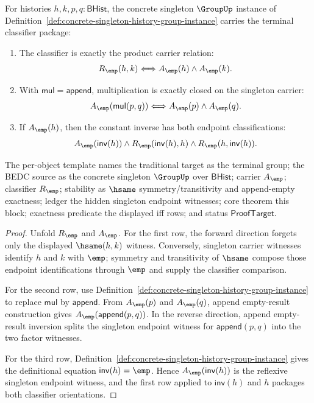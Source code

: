 \begin{theorem}
\label{thm:group-singleton-terminal-classifier-package}
For histories $h,k,p,q:\mathsf{BHist}$, the concrete singleton $\GroupUp$
instance of Definition~\ref{def:concrete-singleton-history-group-instance}
carries the terminal classifier package:
\begin{enumerate}
\item The classifier is exactly the product carrier relation:
$$
R_{\emp}(h,k)\Longleftrightarrow A_{\emp}(h)\land A_{\emp}(k).
$$

\item With $\mathsf{mul}=\mathsf{append}$, multiplication is exactly closed on
the singleton carrier:
$$
A_{\emp}(\mathsf{mul}(p,q))\Longleftrightarrow A_{\emp}(p)\land A_{\emp}(q).
$$

\item If $A_{\emp}(h)$, then the constant inverse has both endpoint
classifications:
$$
A_{\emp}(\mathsf{inv}(h))\land R_{\emp}(\mathsf{inv}(h),h)\land R_{\emp}(h,\mathsf{inv}(h)).
$$
\end{enumerate}
The per-object template names the traditional target as the terminal group; the
BEDC source as the concrete singleton $\GroupUp$ over $\mathsf{BHist}$; carrier
$A_{\emp}$; classifier $R_{\emp}$; stability as $\hsame$ symmetry/transitivity
and append-empty exactness; ledger the hidden singleton endpoint witnesses; core
theorem this block; exactness predicate the displayed iff rows; and status
$\mathsf{ProofTarget}$.
\end{theorem}
\begin{proof}
Unfold $R_{\emp}$ and $A_{\emp}$. For the first row, the forward direction
forgets only the displayed $\hsame(h,k)$ witness. Conversely, singleton carrier
witnesses identify $h$ and $k$ with $\emp$; symmetry and transitivity of
$\hsame$ compose those endpoint identifications through $\emp$ and supply the
classifier comparison.

For the second row, use Definition~\ref{def:concrete-singleton-history-group-instance}
to replace $\mathsf{mul}$ by $\mathsf{append}$. From $A_{\emp}(p)$ and
$A_{\emp}(q)$, append empty-result construction gives
$A_{\emp}(\mathsf{append}(p,q))$. In the reverse direction, append empty-result
inversion splits the singleton endpoint witness for $\mathsf{append}(p,q)$ into
the two factor witnesses.

For the third row, Definition~\ref{def:concrete-singleton-history-group-instance}
gives the definitional equation $\mathsf{inv}(h)=\emp$. Hence
$A_{\emp}(\mathsf{inv}(h))$ is the reflexive singleton endpoint witness, and the
first row applied to $\mathsf{inv}(h)$ and $h$ packages both classifier
orientations.
\end{proof}

